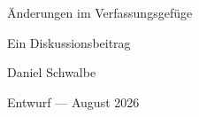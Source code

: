 \documentclass[a4paper, 12pt, numbers=noenddot, parskip=half]{scrartcl}
\begin{document}
\begin{titlepage}
  \centering
  \vspace*{6cm}
  {\LARGE Änderungen im Verfassungsgefüge\par}
  \vspace{2cm}
  {\normalsize Ein Diskussionsbeitrag\par}
  \vspace{1cm}
  {\normalsize Daniel Schwalbe\par}
  \vspace{1cm}
  {\normalsize Entwurf --- August 2026\par}
  \vfill
\end{titlepage}

\tableofcontents
\newpage


\end{document}
